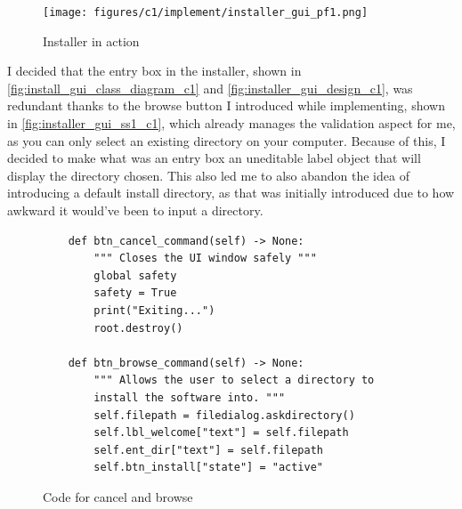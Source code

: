 \documentclass[11pt]{article}
\begin{document}
            \begin{figure}[!ht]
                \centering
                \texttt{[image: figures/c1/implement/installer\_gui\_pf1.png]}
                \caption{Installer in action}
                \label{fig:installer_gui_ss1_c1}
            \end{figure}


            I decided that the entry box in the installer, shown in \autoref{fig:install_gui_class_diagram_c1} and \autoref{fig:installer_gui_design_c1}, was redundant thanks to the browse button I introduced while implementing, shown in \autoref{fig:installer_gui_ss1_c1}, which already manages the validation aspect for me, as you can only select an existing directory on your computer. Because of this, I decided to make what was an entry box an uneditable label object that will display the directory chosen. This also led me to also abandon the idea of introducing a default install directory, as that was initially introduced due to how awkward it would've been to input a directory.

            \begin{figure}[!ht]
                \begin{verbatim}
    def btn_cancel_command(self) -> None:
        """ Closes the UI window safely """
        global safety
        safety = True
        print("Exiting...")
        root.destroy()

    def btn_browse_command(self) -> None:
        """ Allows the user to select a directory to 
        install the software into. """
        self.filepath = filedialog.askdirectory()
        self.lbl_welcome["text"] = self.filepath
        self.ent_dir["text"] = self.filepath
        self.btn_install["state"] = "active"
                \end{verbatim}
                \caption{Code for cancel and browse}
                \label{sc:cancel_and_browse_btns_sc_c1}
            \end{figure}
\end{document}
